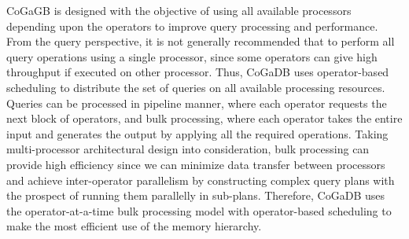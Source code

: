 CoGaGB is designed with the objective of using all available processors depending upon the operators to improve query processing and performance. From the query perspective, it is not generally recommended that to perform all query operations using a single processor, since some operators can give high throughput if executed on other processor. Thus, CoGaDB uses operator-based scheduling to distribute the set of queries on all available processing resources\cite{cogadb_design_impl}.
Queries can be processed in pipeline manner, where each operator requests the next block of operators, and bulk processing, where each operator takes the entire input and generates the output by applying all the required operations. Taking multi-processor architectural design into consideration, bulk processing can provide high efficiency since we can minimize data transfer between processors and achieve inter-operator parallelism by constructing complex query plans with the prospect of running them parallelly in sub-plans. Therefore, CoGaDB uses the operator-at-a-time bulk processing model with operator-based scheduling to make the most efficient use of the memory hierarchy.